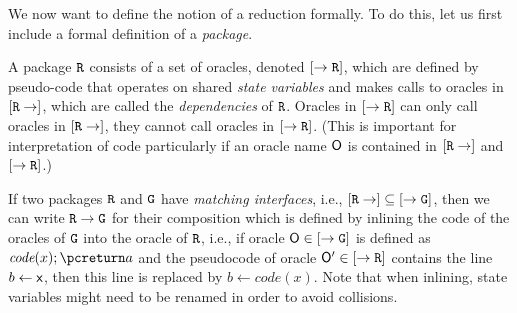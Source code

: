 We now want to define the notion of a reduction formally. To do this, let us first include a formal definition of
a \emph{package}.
\begin{definition}[Package]
      A package $\text{\texttt{R}}$ consists of a set of oracles, denoted $[\rightarrow \text{\texttt{R}}]$,
      which are defined by pseudo-code that operates on shared \emph{state variables} and makes calls to oracles in $[\text{\texttt{R}}\rightarrow]$,
      which are called the \emph{dependencies} of $\text{\texttt{R}}$. Oracles in $[\rightarrow \text{\texttt{R}}]$
      can only call oracles in $[\text{\texttt{R}}\rightarrow]$, they cannot call oracles in $[\rightarrow \text{\texttt{R}}]$.
      (This is important for interpretation of code particularly if an oracle name $\mathsf{O}$ is contained
      in $[\text{\texttt{R}}\rightarrow]$ and $[\rightarrow \text{\texttt{R}}]$.)
\end{definition}
\begin{definition}
      If two packages $\text{\texttt{R}}$ and $\text{\texttt{G}}$ have \emph{matching interfaces}, i.e.,
      $[\text{\texttt{R}}\rightarrow]\subseteq[\rightarrow\text{\texttt{G}}]$, then we can write
      $\text{\texttt{R}}\rightarrow\text{\texttt{G}}$ for their composition which is defined by
      inlining the code of the oracles of $\text{\texttt{G}}$ into the oracle of $\text{\texttt{R}}$,
      i.e., if oracle $\mathsf{O}\in[\rightarrow\text{\texttt{G}}]$ is defined as $\textit{code}(x);\pcreturn a$
      and the pseudocode of oracle $\mathsf{O}'\in[\rightarrow\text{\texttt{R}}]$ contains the line
      $b\gets \mathsf{x}$, then this line is replaced by $b\gets\textit{code}(x)$. Note that
      when inlining, state variables might need to be renamed in order to avoid collisions.
\end{definition}

